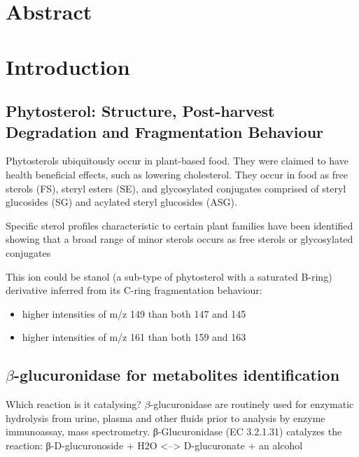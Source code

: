 \section{Abstract}

\section{Introduction}
\subsection{Phytosterol: Structure, Post-harvest Degradation and Fragmentation Behaviour}
Phytosterols ubiquitously occur in plant-based food\cite{sterolmsms}. They were claimed to have health beneficial effects, such as lowering cholesterol. They occur in food as free sterols (FS), steryl esters (SE), and glycosylated conjugates comprised of steryl glucosides (SG) and acylated steryl glucosides (ASG).

Specific sterol profiles characteristic to certain plant families have been identified showing that a broad range of minor sterols occurs as free sterols or glycosylated conjugates

This ion could be stanol (a sub-type of phytosterol with a saturated B-ring) derivative inferred from its C-ring fragmentation behaviour: 
\begin{itemize}
	\item higher intensities of m/z 149 than both 147 and 145
	\item higher intensities of m/z 161 than both 159 and 163
\end{itemize}
 

\subsection{$\beta$-glucuronidase for metabolites identification}


Which reaction is it catalysing?
$\beta$-glucuronidase are routinely used for enzymatic hydrolysis from urine, plasma and other fluids prior to analysis by enzyme immunoassay, mass spectrometry.
β-Glucuronidase (EC 3.2.1.31) catalyzes the reaction:
β-D-glucuronoside + H2O <--> D-glucuronate + an alcohol

